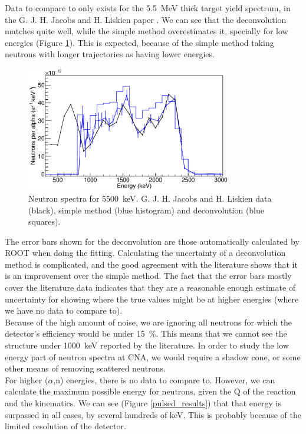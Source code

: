 \documentclass[a4paper,12pt]{report}
\newcommand{\an}{($\alpha$,n) }
\begin{document}
Data to compare to only exists for the \qty{5.5}{\MeV} thick target yield spectrum, in the G. J. H. Jacobs and H. Liskien paper \cite{jacobs}.
We can see that the deconvolution matches quite well, while the simple method overestimates it, specially for low energies (Figure \ref{pulsed_5mev}).
This is expected, because of the simple method taking neutrons with longer trajectories as having lower energies.

\begin{figure}[H]
	\centering
	\includegraphics[width=0.80\textwidth]{pulsed_5mev.eps}
	\caption{Neutron spectra for \qty{5500}{\keV}.
	G. J. H. Jacobs and H. Liskien data (black), simple method (blue histogram) and deconvolution (blue squares).}
	\label{pulsed_5mev}
\end{figure}

The error bars shown for the deconvolution are those automatically calculated by ROOT when doing the fitting.
Calculating the uncertainty of a deconvolution method is complicated, and the good agreement with the literature shows that it is an improvement over the simple method.
The fact that the error bars mostly cover the literature data indicates that they are a reasonable enough estimate of uncertainty for showing where the true values might be at higher energies (where we have no data to compare to).
\\

Because of the high amount of noise, we are ignoring all neutrons for which the detector's efficiency would be under \qty{15}{\percent}.
This means that we cannot see the structure under \qty{1000}{\keV} reported by the literature.
In order to study the low energy part of neutron spectra at CNA, we would require a shadow cone, or some other means of removing scattered neutrons.
\\

For higher \an energies, there is no data to compare to.
However, we can calculate the maximum possible energy for neutrons, given the Q of the reaction and the kinematics.
We can see (Figure \ref{pulsed_results}) that that energy is surpassed in all cases, by several hundreds of \unit{\keV}.
This is probably because of the limited resolution of the detector.
\end{document}

